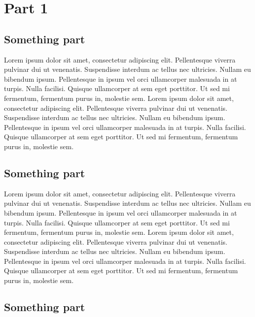 \documentclass[../main.tex]{subfiles}
\begin{document}
	\chapter{Part 1}


	\section{Something part}


Lorem ipsum dolor sit amet, consectetur adipiscing elit. Pellentesque viverra pulvinar dui ut venenatis.
Suspendisse interdum ac tellus nec ultricies. Nullam eu bibendum ipsum. Pellentesque in ipsum vel orci 
ullamcorper malesuada in at turpis. Nulla facilisi. Quisque ullamcorper at sem eget porttitor. Ut sed mi fermentum, 
fermentum purus in, molestie sem.
Lorem ipsum dolor sit amet, consectetur adipiscing elit. Pellentesque viverra pulvinar dui ut venenatis.
Suspendisse interdum ac tellus nec ultricies. Nullam eu bibendum ipsum. Pellentesque in ipsum vel orci 
ullamcorper malesuada in at turpis. Nulla facilisi. Quisque ullamcorper at sem eget porttitor. Ut sed mi fermentum, 
fermentum purus in, molestie sem.

	\vspace{10pt}


	\section{Something part}


Lorem ipsum dolor sit amet, consectetur adipiscing elit. Pellentesque viverra pulvinar dui ut venenatis.
Suspendisse interdum ac tellus nec ultricies. Nullam eu bibendum ipsum. Pellentesque in ipsum vel orci 
ullamcorper malesuada in at turpis. Nulla facilisi. Quisque ullamcorper at sem eget porttitor. Ut sed mi fermentum, 
fermentum purus in, molestie sem.
Lorem ipsum dolor sit amet, consectetur adipiscing elit. Pellentesque viverra pulvinar dui ut venenatis.
Suspendisse interdum ac tellus nec ultricies. Nullam eu bibendum ipsum. Pellentesque in ipsum vel orci 
ullamcorper malesuada in at turpis. Nulla facilisi. Quisque ullamcorper at sem eget porttitor. Ut sed mi fermentum, 
fermentum purus in, molestie sem.

	\vspace{10pt}

	\section{Something part}
\end{document}
